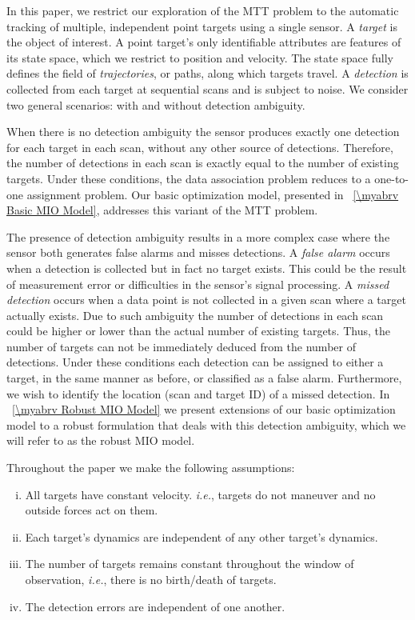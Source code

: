 In this paper, we restrict our exploration of the MTT problem to the automatic tracking of multiple, independent point targets using a single sensor. A \textit{target} is the object of interest. A point target's only identifiable attributes are features of its state space, which we restrict to position and velocity. The state space fully defines the field of \textit{trajectories}, or paths, along which targets travel. A \textit{detection} is collected from each target at sequential scans and is subject to noise. We consider two general scenarios: with and without detection ambiguity. 

When there is no detection ambiguity the sensor produces exactly one detection for each target in each scan, without any other source of detections. Therefore, the number of detections in each scan is exactly equal to the number of existing targets. Under these conditions, the data association problem reduces to a one-to-one assignment problem. Our basic optimization model, presented in \mysection~\ref{\myabrv Basic MIO Model}, addresses this variant of the MTT problem.

The presence of detection ambiguity results in a more complex case where the sensor both generates false alarms and misses detections. A \textit{false alarm} occurs when a detection is collected but in fact no target exists. This could be the result of measurement error or difficulties in the sensor's signal processing. A \textit{missed detection} occurs when a data point is not collected in a given scan where a target actually exists. Due to such ambiguity the number of detections in each scan could be higher or lower than the actual number of existing targets. Thus, the number of targets can not be immediately deduced from the number of detections. Under these conditions each detection can be assigned to either a target, in the same manner as before, or classified as a false alarm. Furthermore, we wish to identify the location (scan and target ID) of a missed detection. In \mysection~\ref{\myabrv Robust MIO Model} we present extensions of our basic optimization model to a robust formulation that deals with this detection ambiguity, which we will refer to as the robust MIO model.

Throughout the paper we make the following assumptions:
\begin{assumption}\label{ass:general_assumption}
\leavevmode
\begin{enumerate}[(i)]
\item All targets have constant velocity. \textit{i.e.}, targets do not maneuver and no outside forces act on them.
\item Each target's dynamics are independent of any other target's dynamics.
\item The number of targets remains constant throughout the window of observation, \textit{i.e.}, there is no birth/death of targets.
\item The detection errors are independent of one another.
\end{enumerate}
\end{assumption}

